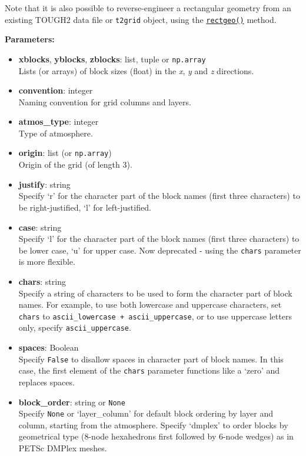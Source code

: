 Note that it is also possible to reverse-engineer a rectangular geometry from an existing TOUGH2 data file or \texttt{t2grid} object, using the \hyperref[sec:t2grid:rectgeo]{\texttt{rectgeo()}} method.

\textbf{Parameters:}
\begin{itemize}
\item \textbf{xblocks}, \textbf{yblocks}, \textbf{zblocks}: list, tuple or \texttt{np.array}\\
  Lists (or arrays) of block sizes (float) in the \emph{x}, \emph{y} and \emph{z} directions.
\item \textbf{convention}: integer\\
  Naming convention for grid columns and layers.
\item \textbf{atmos\_type}: integer\\
  Type of atmosphere.
\item \textbf{origin}: list (or \texttt{np.array})\\
  Origin of the grid (of length 3).
\item \textbf{justify}: string\\
  Specify `r' for the character part of the block names (first three characters) to be right-justified, `l' for left-justified.
\item \textbf{case}: string\\
  Specify `l' for the character part of the block names (first three characters) to be lower case, `u' for upper case.  Now deprecated - using the \texttt{chars} parameter is more flexible.
\item \textbf{chars}: string\\
  Specify a string of characters to be used to form the character part of block names.  For example, to use both lowercase and uppercase characters, set \texttt{chars} to \texttt{ascii\_lowercase + ascii\_uppercase}, or to use uppercase letters only, specify \texttt{ascii\_uppercase}.
\item \textbf{spaces}: Boolean\\
  Specify \texttt{False} to disallow spaces in character part of block names. In this case, the first element of the \texttt{chars} parameter functions like a `zero' and replaces spaces.
\item \textbf{block\_order}: string or \texttt{None}\\
  Specify \texttt{None} or `layer\_column' for default block ordering by layer and column, starting from the atmosphere. Specify `dmplex' to order blocks by geometrical type (8-node hexahedrons first followed by 6-node wedges) as in PETSc DMPlex meshes.
\end{itemize}


